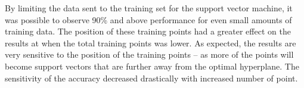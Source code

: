 By limiting the data sent to the training set for the support vector machine, it was possible to observe 90\% and above performance for even small amounts of training data. The position of these training points had a greater effect on the results at when the total training points was lower. As expected, the results are very sensitive to the position of the training points -- as more of the points will become support vectors that are further away from the optimal hyperplane. The sensitivity of the accuracy decreased drastically with increased number of point.






